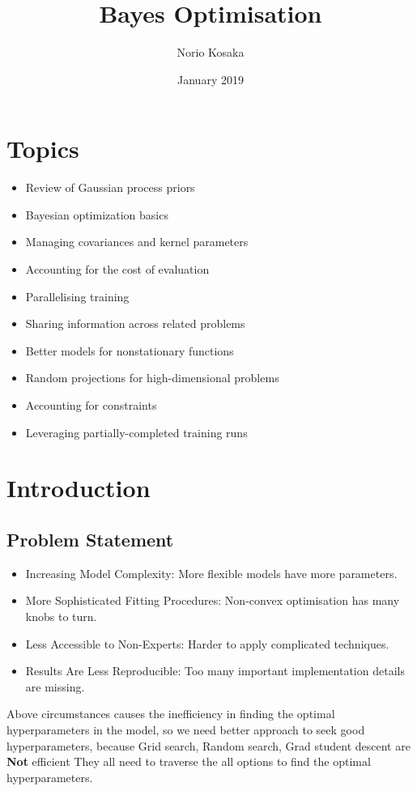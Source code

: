 \documentclass{article}
\title{Bayes Optimisation}
\author{Norio Kosaka}
\date{January 2019}
\theoremstyle{definition}
\begin{document}
\maketitle
\tableofcontents


\section{Topics}
\begin{itemize}
    \item Review of Gaussian process priors
    \item Bayesian optimization basics
    \item Managing covariances and kernel parameters
    \item Accounting for the cost of evaluation
    \item Parallelising training
    \item Sharing information across related problems
    \item Better models for nonstationary functions
    \item Random projections for high-dimensional problems
    \item Accounting for constraints
    \item Leveraging partially-completed training runs
\end{itemize}


\section{Introduction}
\subsection{Problem Statement}
\begin{itemize}
    \item Increasing Model Complexity: More flexible models have more parameters.
    \item More Sophisticated Fitting Procedures: Non-convex optimisation has many knobs to turn.
    \item Less Accessible to Non-Experts: Harder to apply complicated techniques.
    \item Results Are Less Reproducible: Too many important implementation details are missing.
\end{itemize}
Above circumstances causes the inefficiency in finding the optimal hyperparameters in the model, so we need better approach to seek good hyperparameters, because Grid search, Random search, Grad student descent are \textbf{Not} efficient They all need to traverse the all options to find the optimal hyperparameters.
\end{document}
